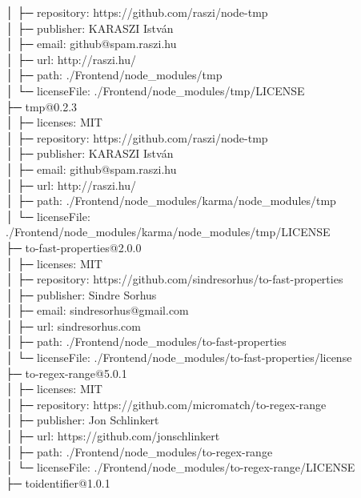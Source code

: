 \documentclass[
    paper=a4,
    twoside=false,
    parskip=half,
    listof=entryprefix,
    listof=totoc,
    index=totoc,
    bibliography=totoc,
    headsepline,
]{scrbook}
\begin{document}
    │  ├─ repository: https://github.com/raszi/node-tmp\\
    │  ├─ publisher: KARASZI István\\
    │  ├─ email: github@spam.raszi.hu\\
    │  ├─ url: http://raszi.hu/\\
    │  ├─ path: ./Frontend/node\_modules/tmp\\
    │  └─ licenseFile: ./Frontend/node\_modules/tmp/LICENSE\\
    ├─ tmp@0.2.3\\
    │  ├─ licenses: MIT\\
    │  ├─ repository: https://github.com/raszi/node-tmp\\
    │  ├─ publisher: KARASZI István\\
    │  ├─ email: github@spam.raszi.hu\\
    │  ├─ url: http://raszi.hu/\\
    │  ├─ path: ./Frontend/node\_modules/karma/node\_modules/tmp\\
    │  └─ licenseFile: ./Frontend/node\_modules/karma/node\_modules/tmp/LICENSE\\
    ├─ to-fast-properties@2.0.0\\
    │  ├─ licenses: MIT\\
    │  ├─ repository: https://github.com/sindresorhus/to-fast-properties\\
    │  ├─ publisher: Sindre Sorhus\\
    │  ├─ email: sindresorhus@gmail.com\\
    │  ├─ url: sindresorhus.com\\
    │  ├─ path: ./Frontend/node\_modules/to-fast-properties\\
    │  └─ licenseFile: ./Frontend/node\_modules/to-fast-properties/license\\
    ├─ to-regex-range@5.0.1\\
    │  ├─ licenses: MIT\\
    │  ├─ repository: https://github.com/micromatch/to-regex-range\\
    │  ├─ publisher: Jon Schlinkert\\
    │  ├─ url: https://github.com/jonschlinkert\\
    │  ├─ path: ./Frontend/node\_modules/to-regex-range\\
    │  └─ licenseFile: ./Frontend/node\_modules/to-regex-range/LICENSE\\
    ├─ toidentifier@1.0.1\\
\end{document}
